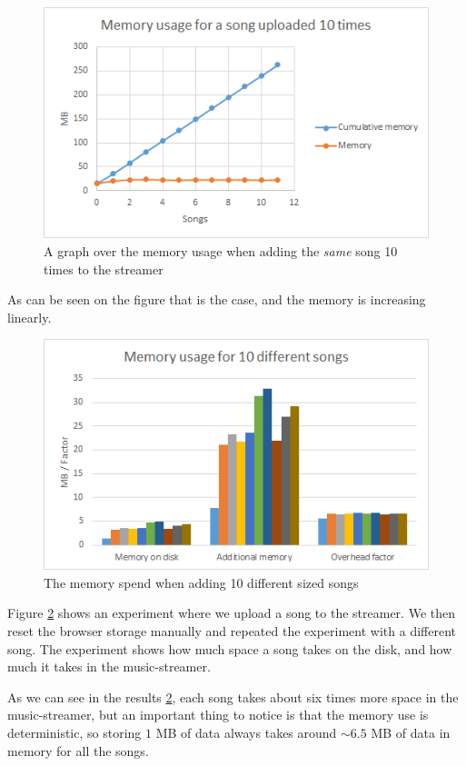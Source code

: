 \begin{figure}[H]
	\centering
	\includegraphics[scale=0.9]{gfx/memoryUsage}
    \caption{A graph over the memory usage when adding the {\em same} song 10 times to the streamer}
	\label{fig:memoryUsage}
\end{figure}
\noindent
As can be seen on the figure that is the case, and the memory is increasing linearly.

\begin{figure}[H]
	\centering
	\includegraphics[scale=0.9]{gfx/memoryDiffSize}
	\caption{The memory spend when adding 10 different sized songs}
	\label{fig:memoryDiffSizes}
\end{figure}
\noindent
Figure \ref{fig:memoryDiffSizes} shows an experiment where we upload a song to the streamer. 
We then reset the browser storage manually and repeated the experiment with a different song.
The experiment shows how much space a song takes on the disk,
and how much it takes in the music-streamer.

As we can see in the results \ref{fig:memoryDiffSizes},
each song takes about six times more space in the music-streamer, 
but an important thing to notice is that the memory use is deterministic,
so storing $1$ MB of data always takes around $\sim6.5$ MB of data in memory for all the songs.

